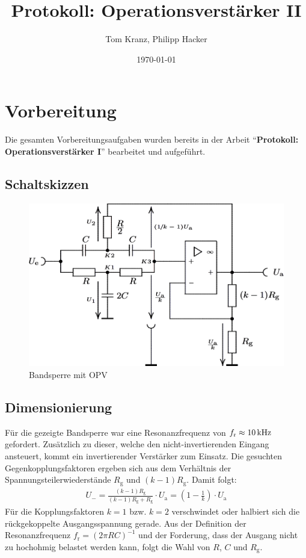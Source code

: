 \documentclass[numbers=noenddot,12pt,a4paper]{scrartcl}
\title{Protokoll: Operationsverstärker II}
\author{Tom Kranz, Philipp Hacker}
\date{\today}
\newcommand{\ix}[1]{_\text{#1}}
\begin{document}
\maketitle
\vspace*{\fill}
\tableofcontents
\vfill
\newpage
\section{Vorbereitung}
Die gesamten Vorbereitungsaufgaben wurden bereits in der Arbeit "`\textbf{Protokoll: Operationsverstärker I}"' bearbeitet und aufgeführt.
\subsection{Schaltskizzen}
\begin{figure}[H]
\centering
\includegraphics[width=\textwidth]{bandsperre.png}
\caption{Bandsperre mit OPV} \label{img:band}
\end{figure}
\subsection{Dimensionierung}
Für die gezeigte Bandsperre war eine Resonanzfrequenz von $f\ix{r}\approx\unit[10]{kHz}$ gefordert. Zusätzlich zu dieser, welche den nicht-invertierenden Eingang ansteuert, kommt ein invertierender Verstärker zum Einsatz. Die gesuchten Gegenkopplungsfaktoren ergeben sich aus dem Verhältnis der Spannungsteilerwiederstände $R\ix{g}$ und $ \left(k-1\right)R\ix{g}$. Damit folgt:
\begin{align*}
U_-=\frac{\left(k-1\right)R\ix{g}}{\left(k-1\right)R\ix{g}+R\ix{g}}\cdot U\ix{a}=\left(1-\frac{1}{k}\right)\cdot U\ix{a}
\end{align*}
Für die Kopplungsfaktoren $k=1$ bzw. $k=2$ verschwindet oder halbiert sich die rückgekoppelte Ausgangsspannung gerade. Aus der Definition der Resonanzfrequenz $f\ix{r}=\left(2\pi R C\right)^{-1}$ und der Forderung, dass der Ausgang nicht zu hochohmig belastet werden kann, folgt die Wahl von $R$, $C$ und $R\ix{g}$.
\end{document}
